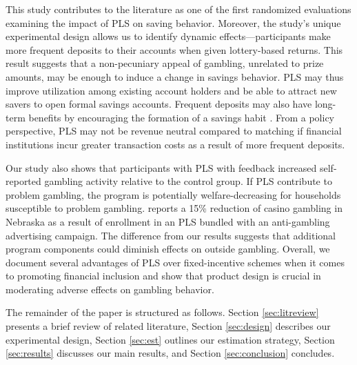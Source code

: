 \documentclass[11pt]{article}
\begin{document}

	This study contributes to the literature as one of the first randomized evaluations examining the impact of PLS on saving behavior. Moreover, the study's unique experimental design allows us to identify dynamic effects---participants make more frequent deposits to their accounts when given lottery-based returns. This result suggests that a non-pecuniary appeal of gambling, unrelated to prize amounts, may be enough to induce a change in savings behavior. PLS may thus improve utilization among existing account holders and be able to attract new savers to open formal savings accounts. Frequent deposits may also have long-term benefits by encouraging the formation of a savings habit . From a policy perspective, PLS may not be revenue neutral compared to matching if financial institutions incur greater transaction costs as a result of more frequent deposits.


	Our study also shows that participants with PLS with feedback increased self-reported gambling activity relative to the control group. If PLS contribute to problem gambling, the program is potentially welfare-decreasing for households susceptible to problem gambling.  reports a 15\% reduction of casino gambling in Nebraska as a result of enrollment in an PLS bundled with an anti-gambling advertising campaign. The difference from our results suggests that additional program components could diminish effects on outside gambling. Overall, we document several advantages of PLS over fixed-incentive schemes when it comes to promoting financial inclusion and show that product design is crucial in moderating adverse effects on gambling behavior.


	The remainder of the paper is structured as follows. Section \ref{sec:litreview} presents a brief review of related literature, Section \ref{sec:design} describes our experimental design, Section \ref{sec:est} outlines our estimation strategy, Section \ref{sec:results} discusses our main results, and Section \ref{sec:conclusion} concludes.
\end{document}
